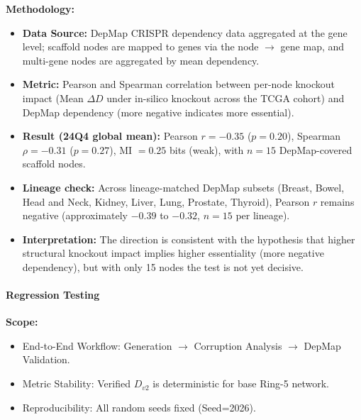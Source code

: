\textbf{Methodology:}
\begin{itemize}
    \item \textbf{Data Source:} DepMap CRISPR dependency data aggregated at the gene level; scaffold nodes are mapped to genes via the node $\rightarrow$ gene map, and multi-gene nodes are aggregated by mean dependency.
    \item \textbf{Metric:} Pearson and Spearman correlation between per-node knockout impact (Mean $\Delta D$ under in-silico knockout across the TCGA cohort) and DepMap dependency (more negative indicates more essential).
    \item \textbf{Result (24Q4 global mean):} Pearson $r=-0.35$ ($p=0.20$), Spearman $\rho=-0.31$ ($p=0.27$), MI $=0.25$ bits (weak), with $n=15$ DepMap-covered scaffold nodes.
    \item \textbf{Lineage check:} Across lineage-matched DepMap subsets (Breast, Bowel, Head and Neck, Kidney, Liver, Lung, Prostate, Thyroid), Pearson $r$ remains negative (approximately $-0.39$ to $-0.32$, $n=15$ per lineage).
    \item \textbf{Interpretation:} The direction is consistent with the hypothesis that higher structural knockout impact implies higher essentiality (more negative dependency), but with only 15 nodes the test is not yet decisive.
\end{itemize}

\paragraph{Regression Testing}
\textbf{Scope:}
\begin{itemize}
    \item End-to-End Workflow: Generation $\rightarrow$ Corruption Analysis $\rightarrow$ DepMap Validation.
    \item Metric Stability: Verified $D_{v2}$ is deterministic for base Ring-5 network.
    \item Reproducibility: All random seeds fixed (Seed=2026).
\end{itemize}

